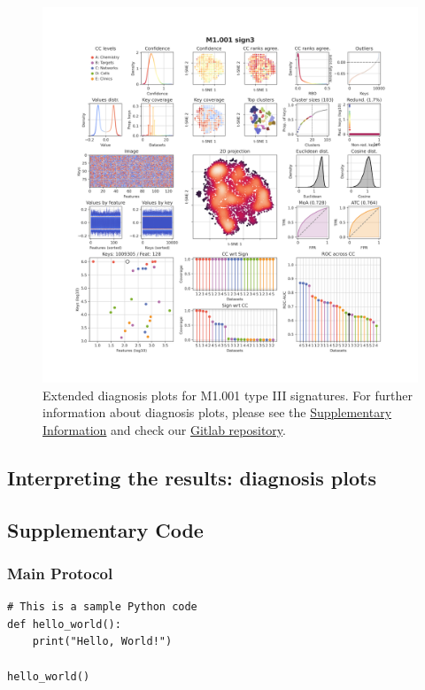 \begin{figure}[htbp]
  \centering
  \includegraphics[width=1\linewidth]{figures/Protocols/Supplementary/M1.001_sign3_local_CC_M1_sign0_medium.png}
  \caption{
    Extended diagnosis plots for M1.001 type III signatures. For further information about diagnosis plots, please see the \hyperref[Supplementary_Protocols_Diagnosis]{Supplementary Information} and check our \href{https://gitlabsbnb.irbbarcelona.org/packages/protocols}{Gitlab repository}.
  }
  \label{Protocols_FigS11}
\end{figure}



\subsection{Interpreting the results: diagnosis plots}
\label{Supplementary_Protocols_Diagnosis}







\subsection{Supplementary Code}

\subsubsection{Main Protocol}

\begin{lstlisting}
# This is a sample Python code
def hello_world():
    print("Hello, World!")

hello_world()
\end{lstlisting}